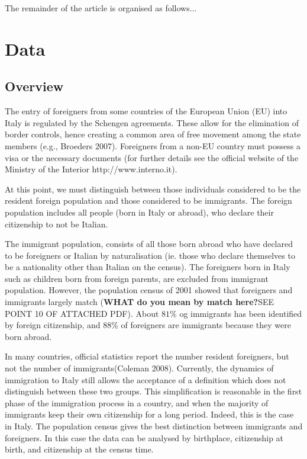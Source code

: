 \documentclass[10pt] {article}
\theoremstyle{definition}
\theoremstyle{plain}
\begin{document}
The remainder of the article is organised as follows...


\section{Data \label{DAT}}

\subsection{Overview \label{SDC}}

The entry of foreigners from some countries of the European Union (EU) into Italy is regulated by the Schengen agreements. These allow for the elimination of border controls, hence creating a common area of free movement among the state members (e.g., Broeders 2007). Foreigners from a non-EU country must possess a visa or the necessary documents (for further details see the official website of the Ministry of the Interior http://www.interno.it). 
 
At this point, we must distinguish between those individuals considered to be the resident foreign population and those considered to be immigrants. The foreign population includes all people (born in Italy or abroad), who declare their citizenship to not be Italian. 

The immigrant population, consists of all those born abroad who have declared to be foreigners or Italian by naturalisation (ie. those who declare themselves to be a nationality other than Italian on the census). The foreigners born in Italy such as children born from foreign parents, are excluded from immigrant population. However, the population census of 2001 showed that foreigners and immigrants largely match ({\bf WHAT do you mean by match here?}SEE POINT 10 OF ATTACHED PDF). About $81\%$ og immigrants has been identified by foreign citizenship, and $88\%$ of foreigners are immigrants because they were born abroad.

In many countries, official statistics report the number resident foreigners, but not the number of immigrants(Coleman 2008). Currently, the dynamics of immigration to Italy still allows the acceptance of a definition which does not distinguish between these two groups. This simplification is reasonable in the first phase of the immigration process in a country, and when the majority of immigrants keep their own citizenship for a long period. Indeed, this is the case in Italy. The population census gives the best distinction between immigrants and foreigners. In this case the data can be analysed by birthplace, citizenship at birth, and citizenship at the census time. 
 
\end{document}
